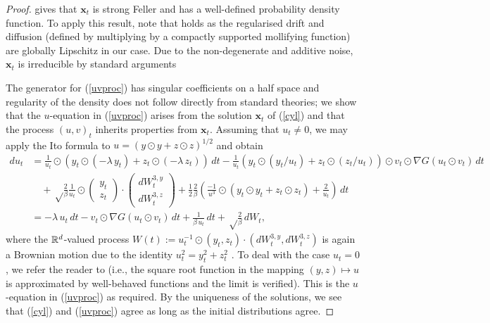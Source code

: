 \documentclass[11pt, twoside]{report}
\renewcommand{\vec}[1]{{\mathbf{#1}}}
\begin{document}
\begin{proof}
\cite[Corollary 10.1.4]{Stroock2013-df} gives that $\vec x_t$ is strong Feller and has a well-defined probability density function. To apply this result, note that \cite[Equation (1.7) of Theorem 10.1.3]{Stroock2013-df} holds as the regularised drift and diffusion (defined by multiplying by a compactly supported mollifying function) are globally Lipschitz in our case.
Due to the non-degenerate and additive noise, $\vec x_t$ is irreducible by standard arguments~\cite[Section 6]{Bellet2006-pq}


 The generator for (\ref{uvproc}) has singular coefficients on a half space and regularity of the density does not follow directly from standard theories; we show that the $u$-equation in (\ref{uvproc}) arises from the solution $\vec x_t$ of (\ref{cyl}) and that the process $(u,v)_t$ inherits properties from $\vec x_t$. Assuming that $u_t\ne 0$, we may apply the Ito formula to  $u=(y\odot y+z\odot z)^{1/2}$ and obtain
$$
\begin{aligned}
  du_t&=\frac{1}{u_t}\odot(y_t\odot(-\lambda\,y_t)+z_t\odot(-\lambda\, z_t))\,dt
  -\frac{1}{u_t}(y_t\odot (y_t/u_t)+z_t\odot(z_t/u_t))\odot v_t\odot \nabla G(u_t\odot v_t)\,dt \\&\quad+\sqrt\frac{2}{\beta} \frac 1{u_t} \odot\begin{pmatrix}y_t\\z_t\end{pmatrix}
  \cdot\begin{pmatrix} dW_t^{3,y}\\ dW_t^{3,z}\end{pmatrix}
  + \frac 12 \frac{2}{\beta} \left(\frac{-1}{u^3}\odot(y_t\odot y_t+z_t\odot z_t)+\frac{2}{u_t}\right)\,dt\\
  &=-\lambda\,   u_t\,dt - v_t\odot \nabla G(u_t\odot v_t)\,dt
 +\frac{1}{\beta \,u_t}\,dt+ \sqrt\frac{2}{\beta}\,dW_t,
\end{aligned}
$$	
where the $\mathbb{R}^d$-valued process $W(t):= u_t^{-1} \odot(y_t,z_t)
  \cdot (dW_t^{3,y}, dW_t^{3,z})$ is again a Brownian motion due to the identity $u^2_t = y^2_t + z^2_t$ \cite[Theorem 3.3.16]{Karatzas1991-xr}. To deal with the case $u_t=0$, we refer the reader to \cite[Proposition 3.21]{Karatzas1991-xr} (i.e., the square root function in the mapping $(y,z)\mapsto u$ is approximated by well-behaved functions and the limit is verified).
This is the $u$-equation in (\ref{uvproc}) as required. By the uniqueness of the solutions, we see that (\ref{cyl}) and (\ref{uvproc}) agree  as long as the initial distributions agree.


\end{proof}
\end{document}
